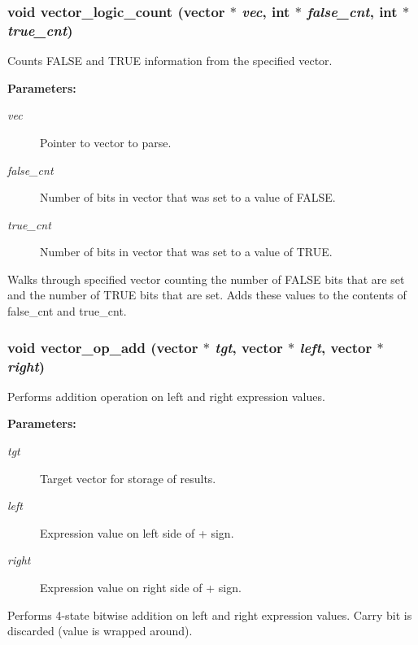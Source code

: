 \subsubsection{\setlength{\rightskip}{0pt plus 5cm}void vector\_\-logic\_\-count ({\bf vector} $\ast$ {\em vec}, int $\ast$ {\em false\_\-cnt}, int $\ast$ {\em true\_\-cnt})}\label{vector_8h_a21}


Counts FALSE and TRUE information from the specified vector.

\begin{Desc}
\item[{\bf Parameters: }]\par
\begin{description}
\item[
{\em vec}]Pointer to vector to parse. \item[
{\em false\_\-cnt}]Number of bits in vector that was set to a value of FALSE. \item[
{\em true\_\-cnt}]Number of bits in vector that was set to a value of TRUE.

\end{description}
\end{Desc}
Walks through specified vector counting the number of FALSE bits that are set and the number of TRUE bits that are set. Adds these values to the contents of false\_\-cnt and true\_\-cnt. 
\subsubsection{\setlength{\rightskip}{0pt plus 5cm}void vector\_\-op\_\-add ({\bf vector} $\ast$ {\em tgt}, {\bf vector} $\ast$ {\em left}, {\bf vector} $\ast$ {\em right})}\label{vector_8h_a26}


Performs addition operation on left and right expression values.

\begin{Desc}
\item[{\bf Parameters: }]\par
\begin{description}
\item[
{\em tgt}]Target vector for storage of results. \item[
{\em left}]Expression value on left side of + sign. \item[
{\em right}]Expression value on right side of + sign.

\end{description}
\end{Desc}
Performs 4-state bitwise addition on left and right expression values. Carry bit is discarded (value is wrapped around). 
